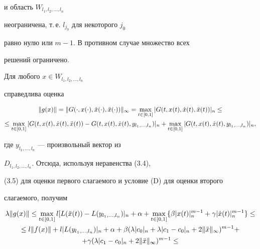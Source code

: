 \begin{pf}
\begin{pf}
и область $W_{l_1, l_2, \dotsc, l_n}$ 


неограничена, т.\,е. $l_{j_0}$ для некоторого $j_0$


равно нулю или $m-1$. В противном случае множество всех 


решений ограничено.


Для любого $x\in W_{l_1, l_2, \dotsc, l_n}$ 


справедлива оценка


\begin{multline*}


\|g(x)\| = \|G(\cdot, x(\cdot), \Dot x(\cdot), \Ddot x(\cdot))\|_\infty=


\max\limits_{t\in[0,1]} |G(t, x(t), \Dot x(t), \Ddot x(t))|_n\leq \\


%


\leq\max\limits_{t\in[0,1]} |G(t, x(t), \Dot x(t), \Ddot x(t)) -


G(t, x(t), \Dot x(t), y_{l_1,\dotsc, l_n})|_n + 


\max\limits_{t\in[0,1]} |G(t, x(t), \Dot x(t), y_{l_1,\dotsc, l_n})|_n,


\end{multline*}


где $y_{l_1,\dotsc, l_n}$ --- произвольный вектор из 


$D_{l_1, l_2, \dotsc, l_n}$. Отсюда, используя неравенства (3.4),


(3.5) для оценки первого слагаемого и условие (D) для оценки второго


слагаемого, получим


\begin{multline*}


\lambda\|g(x)\|\leq \max\limits_{t\in [0,1]} 


l[L(\Ddot x(t))-L(y_{l_1, \dotsc, l_n})|_n + \alpha


+ \max\limits_{t\in [0,1]} \{\beta |x(t)|_n^{m-1} + 


\gamma |\Dot x(t)|_n^{m-1}\} \leq \\


%


\leq l\|f(x)\| + l|L(y_{l_1, \dotsc, l_n})|_n + \alpha + 


\beta (\lambda |c_0|_n + \lambda |c_1 - c_0|_n + 


2\|\Ddot x\|_\infty)^{m-1} + \\


%


+ \gamma (\lambda |c_1-c_0|_n + 2\|\Ddot x\|_\infty)^{m-1} \leq



\end{multline*}
\end{pf}
\end{pf}
